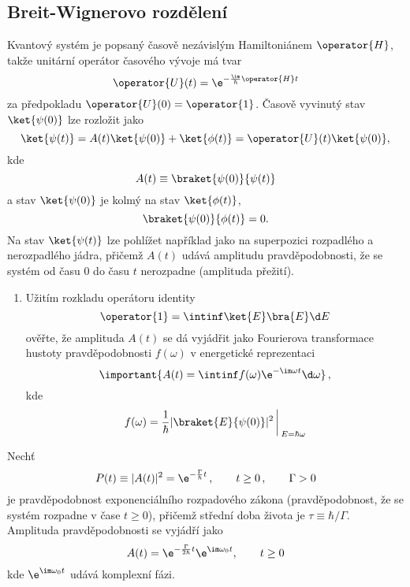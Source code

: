 \subsection{Breit-Wignerovo rozdělení}
Kvantový systém je popsaný časově nezávislým Hamiltoniánem $\operator{H}$, takže unitární operátor časového vývoje má tvar
\begin{equation}
    \operator{U}(t)=\e^{-\frac{\im}{\hbar}\operator{H}t}
\end{equation}
za předpokladu $\operator{U}(0)=\operator{1}$.
Časově vyvinutý stav $\ket{\psi(0)}$ lze rozložit jako
\begin{equation}
    \ket{\psi(t)}=A(t)\ket{\psi(0)}+\ket{\phi(t)}=\operator{U}(t)\ket{\psi(0)},
\end{equation}
kde
\begin{equation}
    \label{eq:BreitWignerA}
    A(t)\equiv\braket{\psi(0)}{\psi(t)}
\end{equation}
a stav $\ket{\psi(0)}$ je kolmý na stav $\ket{\phi(t)}$,
\begin{equation}
    \braket{\psi(0)}{\phi(t)}=0.
\end{equation}
Na stav $\ket{\psi(t)}$ lze pohlížet například jako na superpozici rozpadlého a nerozpadlého jádra, 
přičemž	$A(t)$ udává amplitudu pravděpodobnosti, že se systém od času $0$ do času $t$ nerozpadne (amplituda přežití).

\begin{enumerate}
\item 
    Užitím rozkladu operátoru identity
    \begin{equation}
        \operator{1}=\intinf\ket{E}\bra{E}\d E
    \end{equation}
    ověřte, že amplituda $A(t)$ se dá vyjádřit jako Fourierova transformace 
    hustoty pravděpodobnosti $f(\omega)$ v energetické reprezentaci
    \begin{equation}
        \label{eq:BreitWignerFT}
        \important{A(t)=\intinf f(\omega)\e^{-\im\omega t}\d\omega}\,,
    \end{equation}
    kde 
    \begin{equation}
        \label{eq:BreitWignerf}
        f(\omega)=\frac{1}{\hbar}|\braket{E}{\psi(0)}|^{2}\bigg\arrowvert_{E=\hbar\omega}
    \end{equation}
\end{enumerate}

Nechť
\begin{equation}
    P(t)\equiv|A(t)|^{2}=\e^{-\frac{\Gamma}{\hbar}t}\,,\qquad t\geq0\,,\qquad\Gamma>0
\end{equation}
je pravděpodobnost exponenciálního rozpadového zákona (pravděpodobnost, že se systém rozpadne v čase $t\geq0$),
přičemž střední doba života je $\tau\equiv\hbar/\Gamma$.
Amplituda pravděpodobnosti se vyjádří jako
\begin{equation}
    \label{eq:BreitWignerAexp}
    A(t)=\e^{-\frac{\Gamma}{2\hbar}t}\e^{\im\omega_{0}t},\qquad t\geq0
\end{equation}
kde $\e^{\im\omega_{0}t}$ udává komplexní fázi.


